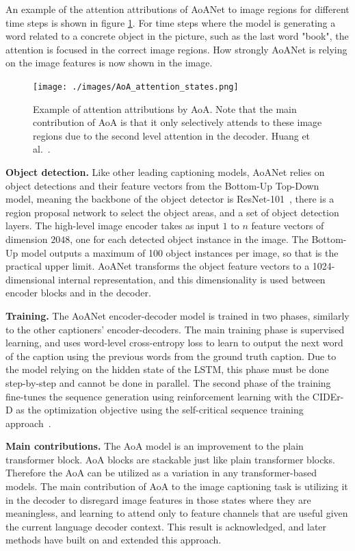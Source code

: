 \documentclass[english,twoside,openright]{HYgraduMLDS}
\begin{document}
An example of the attention attributions of AoANet to image regions for different time steps is shown in figure \ref{fig:AoA_attributions}. For time steps where the model is generating a word related to a concrete object in the picture, such as the last word "book", the attention is focused in the correct image regions. How strongly AoANet is relying on the image features is now shown in the image.

\begin{figure}[H] 
\centering
\texttt{[image: ./images/AoA\_attention\_states.png]}
\caption{Example of attention attributions by AoA. Note that the main contribution of AoA is that it only selectively attends to these image regions due to the second level attention in the decoder. Huang et al.~\cite{AoA}.}
\label{fig:AoA_attributions} 
\end{figure}

\textbf{Object detection.} Like other leading captioning models, AoANet relies on object detections and their feature vectors from the Bottom-Up Top-Down~\cite{BottomUp} model, meaning the backbone of the object detector is ResNet-101~\cite{ResNet}, there is a region proposal network to select the object areas, and a set of object detection layers. The high-level image encoder takes as input $1$ to $n$ feature vectors of dimension $2048$, one for each detected object instance in the image. The Bottom-Up model outputs a maximum of 100 object instances per image, so that is the practical upper limit. AoANet transforms the object feature vectors to a 1024-dimensional internal representation, and this dimensionality is used between encoder blocks and in the decoder.

\textbf{Training.} The AoANet encoder-decoder model is trained in two phases, similarly to the other captioners' encoder-decoders. The main training phase is supervised learning, and uses word-level cross-entropy loss to learn to output the next word of the caption using the previous words from the ground truth caption. Due to the model relying on the hidden state of the LSTM, this phase must be done step-by-step and cannot be done in parallel. The second phase of the training fine-tunes the sequence generation using reinforcement learning with the CIDEr-D as the optimization objective using the self-critical sequence training approach~\cite{SelfCriticalTraining}.

\textbf{Main contributions.} The AoA model is an improvement to the plain transformer block. AoA blocks are stackable just like plain transformer blocks. Therefore the AoA can be utilized as a variation in any transformer-based models. The main contribution of AoA to the image captioning task is utilizing it in the decoder to disregard image features in those states where they are meaningless, and learning to attend only to feature channels that are useful given the current language decoder context. This result is acknowledged, and later methods have built on and extended this approach.
\end{document}
